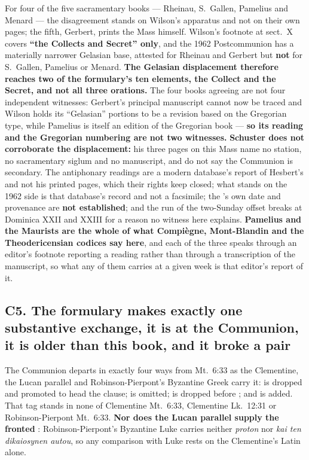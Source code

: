 For four of the five sacramentary books --- Rheinau, S.~Gallen, Pamelius and
Menard --- the disagreement stands on Wilson's apparatus and not on their own
pages; the fifth, Gerbert, prints the Mass himself. Wilson's footnote
at sect.~X covers \textbf{``the Collects and Secret'' only}, and the 1962
Postcommunion has a materially narrower Gelasian base, attested for Rheinau and
Gerbert but \textbf{not} for S.~Gallen, Pamelius or Menard. \textbf{The
Gelasian displacement therefore reaches two of the formulary's ten elements,
the Collect and the Secret, and not all three orations.} The four books agreeing are not four independent
witnesses: Gerbert's principal manuscript cannot now be traced and Wilson holds
its ``Gelasian'' portions to be a revision based on the Gregorian type, while
Pamelius is itself an edition of the Gregorian book --- \textbf{so its reading
and the Gregorian numbering are not two witnesses.} \textbf{Schuster does not
corroborate the displacement:} his three pages on this Mass name no station, no
sacramentary siglum and no manuscript, and do not say the Communion is
secondary. The antiphonary readings are a modern database's report of Hesbert's
 and not his printed pages, which their
rights keep closed; what stands on the 1962 side is that database's record and not a
facsimile; the 's
own date and provenance are \textbf{not established}; and the run of the
two-Sunday offset breaks at Dominica XXII and XXIII for a reason no witness here
explains. \textbf{Pamelius and the Maurists are the whole of what Compiègne,
Mont-Blandin and the Theodericensian codices say here}, and each of the three
speaks through an editor's footnote reporting a reading rather than through a
transcription of the manuscript, so what any of them carries at a given week is
that editor's report of it.

\subsection*{C5. The formulary makes exactly one substantive exchange, it is at the Communion, it is older than this book, and it broke a pair}

The Communion departs in exactly four ways from Mt.\ 6:33 as the Clementine,
the Lucan parallel and Robinson-Pierpont's Byzantine Greek carry it:
 is dropped and  promoted to head the clause;
 is omitted;  is dropped before
; and  is added. That tag stands in none of
Clementine Mt.\ 6:33, Clementine Lk.\ 12:31 or Robinson-Pierpont Mt.\ 6:33.
\textbf{Nor does the Lucan parallel supply the fronted }:
Robinson-Pierpont's Byzantine Luke carries neither \emph{proton} nor \emph{kai ten
dikaiosynen autou}, so any comparison with Luke rests on the Clementine's Latin
alone.

